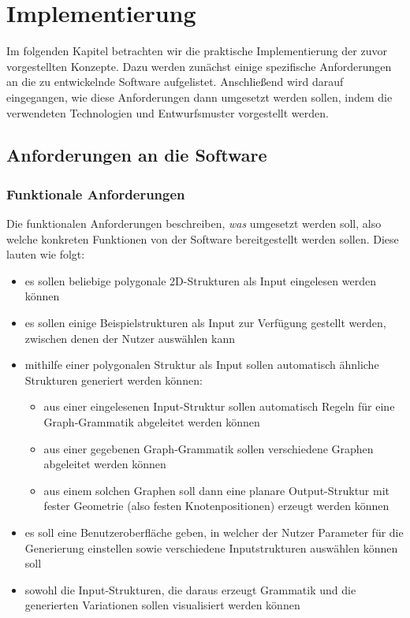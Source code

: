 %
\chapter{Implementierung}
Im folgenden Kapitel betrachten wir die praktische Implementierung der zuvor vorgestellten Konzepte. Dazu werden zunächst
einige spezifische Anforderungen an die zu entwickelnde Software aufgelistet. Anschließend wird darauf eingegangen, wie
diese Anforderungen dann umgesetzt werden sollen, indem die verwendeten Technologien und Entwurfsmuster vorgestellt werden.

\section{Anforderungen an die Software}
\subsection{Funktionale Anforderungen}
Die funktionalen Anforderungen beschreiben, \textit{was} umgesetzt werden soll, also welche konkreten Funktionen von der Software
bereitgestellt werden sollen. Diese lauten wie folgt:

\begin{itemize}
    \item es sollen beliebige polygonale 2D-Strukturen als Input eingelesen werden können
    \item es sollen einige Beispielstrukturen als Input zur Verfügung gestellt werden, zwischen denen der Nutzer auswählen kann
    \item mithilfe einer polygonalen Struktur als Input sollen automatisch ähnliche Strukturen generiert werden können:
    \begin{itemize}
        \item aus einer eingelesenen Input-Struktur sollen automatisch Regeln für eine Graph-Grammatik abgeleitet werden können
        \item aus einer gegebenen Graph-Grammatik sollen verschiedene Graphen abgeleitet werden können
        \item aus einem solchen Graphen soll dann eine planare Output-Struktur mit fester Geometrie (also festen Knotenpositionen) erzeugt werden können
    \end{itemize}
    \item es soll eine Benutzeroberfläche geben, in welcher der Nutzer Parameter für die Generierung einstellen sowie verschiedene Inputstrukturen auswählen können soll
    \item sowohl die Input-Strukturen, die daraus erzeugt Grammatik und die generierten Variationen sollen visualisiert werden können
\end{itemize}

